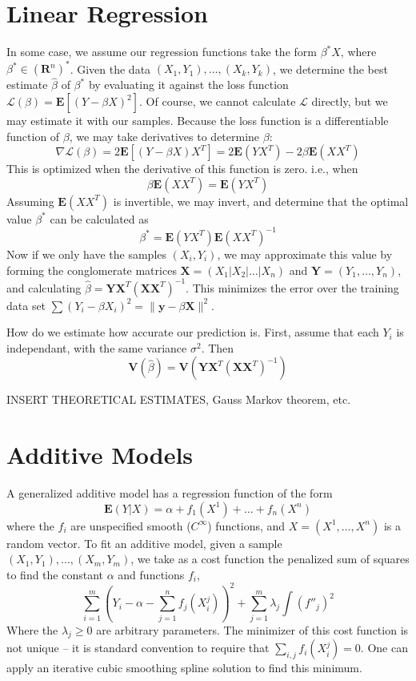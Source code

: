 \section{Linear Regression}

In some case, we assume our regression functions take the form $\beta^* X$, where $\beta^* \in (\mathbf{R}^n)^*$. Given the data $(X_1, Y_1), \dots, (X_k, Y_k)$, we determine the best estimate $\hat{\beta}$ of $\beta^*$ by evaluating it against the loss function $\mathcal{L}(\beta) = \mathbf{E}[(Y - \beta X)^2]$. Of course, we cannot calculate $\mathcal{L}$ directly, but we may estimate it with our samples. Because the loss function is a differentiable function of $\beta$, we may take derivatives to determine $\beta$:
%
\[ \nabla \mathcal{L} (\beta) = 2 \mathbf{E}[(Y - \beta X)X^T] = 2 \mathbf{E}(YX^T) - 2\beta \mathbf{E}(XX^T) \]
%
This is optimized when the derivative of this function is zero. i.e., when
%
\[ \beta \mathbf{E}(XX^T) = \mathbf{E}(YX^T) \]
%
Assuming $\mathbf{E}(XX^T)$ is invertible, we may invert, and determine that the optimal value $\beta^*$ can be calculated as
%
\[ \beta^* = \mathbf{E}(YX^T) \mathbf{E}(XX^T)^{-1} \]
%
Now if we only have the samples $(X_i, Y_i)$, we may approximate this value by forming the conglomerate matrices $\mathbf{X} = (X_1 | X_2 | \dots | X_n)$ and $\mathbf{Y} = (Y_1, \dots, Y_n)$, and calculating $\hat{\beta} = \mathbf{Y} \mathbf{X}^T (\mathbf{X} \mathbf{X}^T)^{-1}$. This minimizes the error over the training data set $\sum (Y_i - \beta X_i)^2 = \|\mathbf{y} - \beta \mathbf{X}\|^2$.

How do we estimate how accurate our prediction is. First, assume that each $Y_i$ is independant, with the same variance $\sigma^2$. Then
%
\[ \mathbf{V}(\hat{\beta}) = \mathbf{V}(\mathbf{Y} \mathbf{X}^T (\mathbf{X} \mathbf{X}^T)^{-1}) \]

INSERT THEORETICAL ESTIMATES, Gauss Markov theorem, etc.





\section{Additive Models}

A generalized additive model has a regression function of the form
%
\[ \mathbf{E}(Y|X) = \alpha + f_1(X^1) + \dots + f_n(X^n) \]
%
where the $f_i$ are unspecified smooth ($C^\infty$) functions, and $X = (X^1, \dots, X^n)$ is a random vector. To fit an additive model, given a sample $(X_1, Y_1), \dots, (X_m, Y_m)$, we take as a cost function the penalized sum of squares to find the constant $\alpha$ and functions $f_i$,
%
\[ \sum_{i = 1}^m \left( Y_i - \alpha - \sum_{j = 1}^n f_j(X_i^j) \right)^2 + \sum_{j = 1}^m \lambda_j \int (f''_j)^2 \]
%
Where the $\lambda_j \geq 0$ are arbitrary parameters. The minimizer of this cost function is not unique -- it is standard convention to require that $\sum_{i,j} f_i(X_i^j) = 0$. One can apply an iterative cubic smoothing spline solution to find this minimum.

